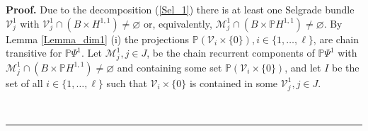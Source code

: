 \documentclass[10pt,a4paper]{amsart}
\newenvironment{proof}[1][Proof]{\noindent\textbf{#1.} }{\ \rule{0.5em}{0.5em}}
\begin{document}
	\begin{proof}
		Due to the decomposition (\ref{Sel_1}) there is at least one Selgrade bundle
		$\mathcal{V}_{j}^{1}$ with $\mathcal{V}_{j}^{1}\cap(B\times H^{1,1}%
		)\not =\varnothing$ or, equivalently, $\mathcal{M}_{j}^{1}\cap\left(
		B\times\mathbb{P}H^{1,1}\right)  \not =\varnothing$. By Lemma \ref{Lemma_dim1}%
		(i) the projections $\mathbb{P}\left(  \mathcal{V}_{i}\times\{0\}\right)
		,i\in\{1,\ldots,\ell\}$, are chain transitive for $\mathbb{P}\Psi^{1}$. Let
		$\mathcal{M}_{j}^{1},j\in J$, be the chain recurrent components of
		$\mathbb{P}\Psi^{1}$ with $\mathcal{M}_{j}^{1}\cap\left(  B\times
		\mathbb{P}H^{1,1}\right)  \not =\varnothing$ and containing some set
		$\mathbb{P}\left(  \mathcal{V}_{i}\times\{0\}\right)  $, and let $I$ be the
		set of all $i\in\{1,\ldots,\ell\}$ such that $\mathcal{V}_{i}\times\{0\}$ is
		contained in some $\mathcal{V}_{j}^{1},j\in J$.
		

\end{proof}
\end{document}
